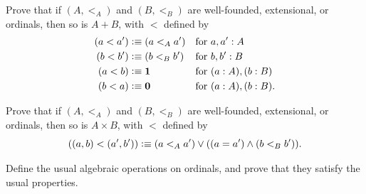 \begin{ex}\label{ex:add-ordinals}
  Prove that if $(A,<_A)$ and $(B,<_B)$ are well-founded, extensional, or ordinals, then so is $A+B$, with $<$ defined by
  \begin{align*}
    (a<a') &\vcentcolon\equiv (a<_A a') & \text{for }& a,a':A\\
    (b<b') &\vcentcolon\equiv (b<_B b') & \text{for }& b,b':B\\
    (a<b) &\vcentcolon\equiv \mathbf{1}      & \text{for }& (a:A),(b:B)\\
    (b<a) &\vcentcolon\equiv \mathbf{0}    & \text{for }& (a:A),(b:B).
  \end{align*}
\end{ex}

\begin{ex}\label{ex:multiply-ordinals}
  Prove that if $(A,<_A)$ and $(B,<_B)$ are well-founded, extensional, or ordinals, then so is $A\times B$, with $<$ defined by
  \[ ((a,b) <(a',b')) \vcentcolon\equiv (a<_A a') \vee ((a=a') \wedge (b<_B b')). \]
\end{ex}

\begin{ex}\label{ex:algebraic-ordinals}
  Define the usual algebraic operations on ordinals, and prove that they satisfy the usual properties.
\end{ex}


